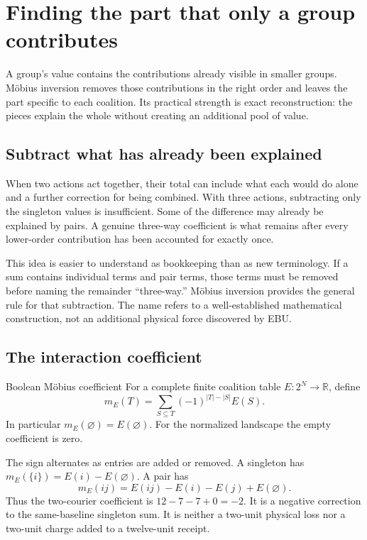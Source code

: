 \chapter{Finding the part that only a group contributes}\label{ch:mobius}

A group's value contains the contributions already visible in smaller groups. Möbius inversion removes those contributions in the right order and leaves the part specific to each coalition. Its practical strength is exact reconstruction: the pieces explain the whole without creating an additional pool of value.


\section{Subtract what has already been explained}
When two actions act together, their total can include what each would do alone and a further correction for being combined. With three actions, subtracting only the singleton values is insufficient. Some of the difference may already be explained by pairs. A genuine three-way coefficient is what remains after every lower-order contribution has been accounted for exactly once.

This idea is easier to understand as bookkeeping than as new terminology. If a sum contains individual terms and pair terms, those terms must be removed before naming the remainder ``three-way.'' Möbius inversion provides the general rule for that subtraction. The name refers to a well-established mathematical construction, not an additional physical force discovered by EBU.

\section{The interaction coefficient}
\begin{definition}{Boolean Möbius coefficient}\label{def:mobius}
For a complete finite coalition table $E:2^N\to\mathbb R$, define
\begin{equation}\label{eq:mobius-main}
 m_E(T)=\sum_{S\subseteq T}(-1)^{|T|-|S|}E(S).
\end{equation}
In particular $m_E(\varnothing)=E(\varnothing)$. For the normalized landscape the empty coefficient is zero.
\end{definition}

The sign alternates as entries are added or removed. A singleton has $m_E(\{i\})=E(i)-E(\varnothing)$. A pair has
\begin{equation}
 m_E(ij)=E(ij)-E(i)-E(j)+E(\varnothing).
\end{equation}
Thus the two-courier coefficient is $12-7-7+0=-2$. It is a negative correction to the same-baseline singleton sum. It is neither a two-unit physical loss nor a two-unit charge added to a twelve-unit receipt.

